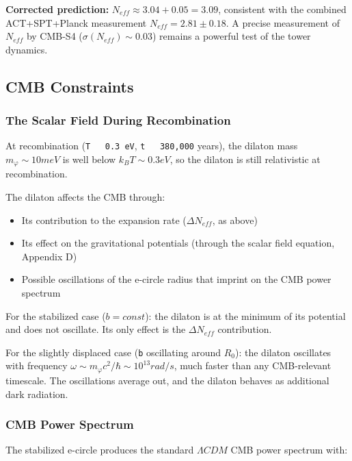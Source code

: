 \documentclass[aps,prd,preprint,superscriptaddress,longbibliography,floatfix]{revtex4-2}
\theoremstyle{remark}
\begin{document}
\textbf{Corrected prediction:} $N_{eff} \approx 3.04 + 0.05 = 3.09$, consistent with the combined ACT+SPT+Planck measurement $N_{eff} = 2.81 \pm 0.18$. A precise measurement of $N_{eff}$ by CMB-S4 ($\sigma(N_{eff}) \sim  0.03$) remains a powerful test of the tower dynamics.



\subsection{CMB Constraints}


\subsubsection{The Scalar Field During Recombination}

At recombination (\texttt{T ~ 0.3 eV}, \texttt{t ~ 380,000} years), the dilaton mass $m_\varphi \sim  10 meV$ is well below $k_B T \sim  0.3 eV$, so the dilaton is still relativistic at recombination.

The dilaton affects the CMB through:

\begin{itemize}
  \item Its contribution to the expansion rate ($\Delta N_{eff}$, as above)
  \item Its effect on the gravitational potentials (through the scalar field equation, Appendix D)
  \item Possible oscillations of the e-circle radius that imprint on the CMB power spectrum
\end{itemize}

For the stabilized case ($b = const$): the dilaton is at the minimum of its potential and does not oscillate. Its only effect is the $\Delta N_{eff}$ contribution.

For the slightly displaced case (\texttt{b} oscillating around $R_{0}$): the dilaton oscillates with frequency $\omega \sim  m_\varphi c^{2}/\hbar \sim  10^{13} rad/s$, much faster than any CMB-relevant timescale. The oscillations average out, and the dilaton behaves as additional dark radiation.


\subsubsection{CMB Power Spectrum}

The stabilized e-circle produces the standard $\Lambda CDM$ CMB power spectrum with:
\end{document}
